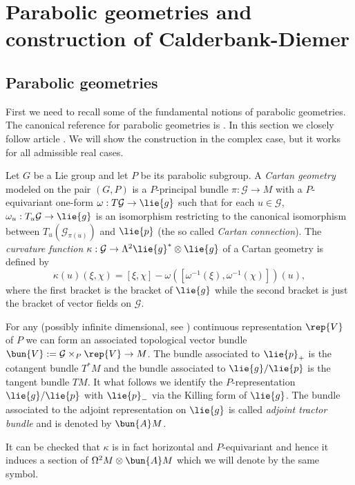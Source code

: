 \chapter{Parabolic geometries and construction of Calderbank-Diemer}


\section{Parabolic geometries}
 First we need to recall some of the fundamental notions of parabolic geometries. The canonical reference for parabolic geometries is \cite{cap_parabolic_2009}. In this section we closely follow article \cite{calderbank_differential_2001}. We will show the construction in the complex case, but it works for all admissible real cases.

 Let $G$ be a Lie group and let $P$ be its parabolic subgroup. A \emph{Cartan geometry} modeled on the pair $(G,P)$ is a $P$-principal bundle $\pi: \mathcal{G} \to M$ with a $P$-equivariant one-form $\omega: T\mathcal{G} \to \lie{g}$ such that for each $u\in \mathcal{G}$, $\omega_u:T_u\mathcal{G}\to\lie{g}$ is an isomorphism restricting to the canonical isomorphism between $T_u(\mathcal{G}_{\pi(u)})$ and $\lie{p}$ (the so called \emph{Cartan connection}). The \emph{curvature function} $\kappa:\mathcal{G} \to \Lambda^2\lie{g}^*\otimes\lie{g}$ of a Cartan geometry is defined by
\[
 \kappa(u)(\xi,\chi) = [\xi,\chi] - \omega( [\omega^{-1}(\xi),\omega^{-1}(\chi)])(u),
\]
where the first bracket is the bracket of $\lie{g}$ while the second bracket is just the bracket of vector fields on $\mathcal{G}$.

For any (possibly infinite dimensional, see \cite{michor}) continuous representation $\rep{V}$ of $P$ we can form an associated topological vector bundle $\bun{V}:=\mathcal{G}\times_P \rep{V} \to M$. The bundle associated to $\lie{p}_+$ is the cotangent bundle $T^*M$ and the bundle associated to $\lie{g}/\lie{p}$ is the tangent bundle $TM$. It what follows we identify the $P$-representation $\lie{g}/\lie{p}$ with $\lie{p}_-$ via the Killing form of $\lie{g}$. The bundle associated to the adjoint representation on $\lie{g}$ is called \emph{adjoint tractor bundle} and is denoted by $\bun{A}M$.

 It can be checked that $\kappa$ is in fact horizontal and $P$-equivariant and hence it induces a section of $\Omega^2M\otimes\bun{A}M$ which we will denote by the same symbol.

